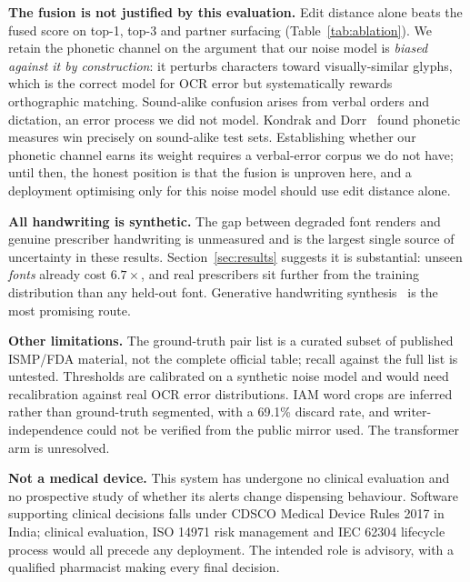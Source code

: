 \documentclass[conference]{IEEEtran}
\begin{document}
\textbf{The fusion is not justified by this evaluation.} Edit distance alone
beats the fused score on top-1, top-3 and partner surfacing
(Table~\ref{tab:ablation}). We retain the phonetic channel on the argument that
our noise model is \emph{biased against it by construction}: it perturbs
characters toward visually-similar glyphs, which is the correct model for OCR
error but systematically rewards orthographic matching. Sound-alike confusion
arises from verbal orders and dictation, an error process we did not
model. Kondrak and Dorr~\cite{kondrak2004identification} found phonetic
measures win precisely on sound-alike test sets. Establishing whether our
phonetic channel earns its weight requires a verbal-error corpus we do not have;
until then, the honest position is that the fusion is unproven here, and a
deployment optimising only for this noise model should use edit distance alone.

\textbf{All handwriting is synthetic.} The gap between degraded font renders and
genuine prescriber handwriting is unmeasured and is the largest single source of
uncertainty in these results. Section~\ref{sec:results} suggests it is
substantial: unseen \emph{fonts} already cost $6.7\times$, and real prescribers
sit further from the training distribution than any held-out font. Generative
handwriting synthesis~\cite{fogel2020scrabblegan} is the most promising route.

\textbf{Other limitations.} The ground-truth pair list is a curated subset of
published ISMP/FDA material, not the complete official table; recall against the
full list is untested. Thresholds are calibrated on a synthetic noise model and
would need recalibration against real OCR error distributions. IAM word crops
are inferred rather than ground-truth segmented, with a 69.1\% discard rate, and
writer-independence could not be verified from the public mirror used. The
transformer arm is unresolved.

\textbf{Not a medical device.} This system has undergone no clinical evaluation
and no prospective study of whether its alerts change dispensing behaviour.
Software supporting clinical decisions falls under CDSCO Medical Device Rules
2017 in India; clinical evaluation, ISO 14971 risk management and IEC 62304
lifecycle process would all precede any deployment. The intended role is
advisory, with a qualified pharmacist making every final decision.
\end{document}
